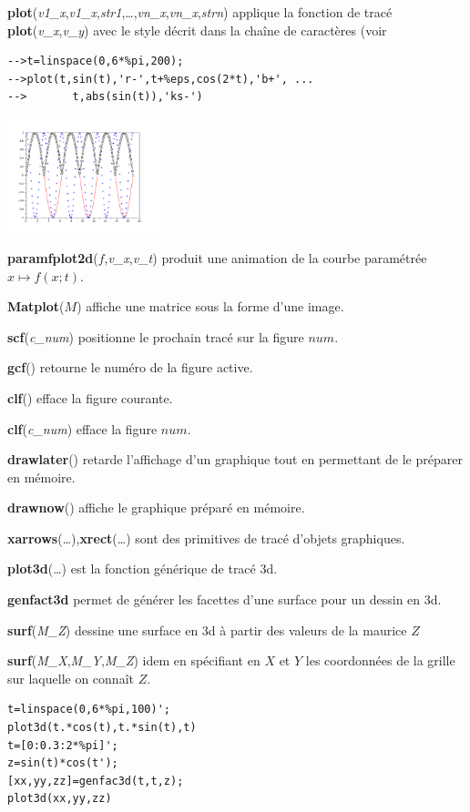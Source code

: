 \documentclass{article}
\begin{document}
\begin{multicols}{3}
\begin{description}
\item{\textbf{plot}(\textit{v1\_x},\textit{v1\_x},\textit{str1},\ldots,\textit{vn\_x},\textit{vn\_x},\textit{strn})}  applique la fonction de tracé \textbf{plot}(\textit{v\_x},\textit{v\_y}) avec le style décrit dans la chaîne de caractères (voir
\begin{verbatim}
-->t=linspace(0,6*%pi,200);
-->plot(t,sin(t),'r-',t+%eps,cos(2*t),'b+', ...
-->       t,abs(sin(t)),'ks-')
\end{verbatim}
\includegraphics[width=0.33\textwidth]{images/courbes3.pdf}
\item{\textbf{paramfplot2d}($f$,\textit{v\_x},\textit{v\_t})} produit une animation de la courbe paramétrée $x \mapsto f(x;t)$.
\item{\textbf{Matplot}($M$)} affiche une matrice sous la forme d'une image.
\item{\textbf{scf}(\textit{c\_num})} positionne le prochain tracé sur la figure $num$.
\item{\textbf{gcf}()} retourne le numéro de la figure active.
\item{\textbf{clf}()} efface la figure courante.
\item{\textbf{clf}(\textit{c\_num})} efface la figure $num$.
\item{\textbf{drawlater}()} retarde l'affichage d'un graphique tout en permettant de le préparer en mémoire.
\item{\textbf{drawnow}()} affiche le graphique préparé en mémoire.
\item{\textbf{xarrows}(\ldots),\textbf{xrect}(\ldots)} sont des primitives de tracé d'objets graphiques.
\item{\textbf{plot3d}(\ldots)} est la fonction générique de tracé 3d.
\item{\textbf{genfact3d}} permet de générer les facettes d'une surface pour un dessin en 3d.
\item{\textbf{surf}(\textit{M\_Z})} dessine une surface en 3d à partir des valeurs de la maurice $Z$
\item{\textbf{surf}(\textit{M\_X},\textit{M\_Y},\textit{M\_Z})} idem en spécifiant en $X$ et $Y$ les coordonnées de la grille sur laquelle on connaît $Z$.
\begin{verbatim}
t=linspace(0,6*%pi,100)';
plot3d(t.*cos(t),t.*sin(t),t)
t=[0:0.3:2*%pi]'; 
z=sin(t)*cos(t');
[xx,yy,zz]=genfac3d(t,t,z);
plot3d(xx,yy,zz)
\end{verbatim}


\end{description}
\end{multicols}
\end{document}
